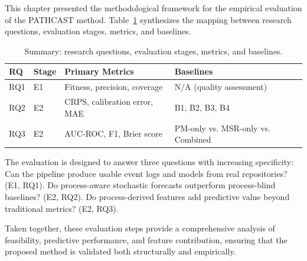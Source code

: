 This chapter presented the methodological framework for the empirical 
evaluation of the PATHCAST method. Table~\ref{tab:methodology-summary} 
synthesizes the mapping between research questions, evaluation stages, 
metrics, and baselines.

\begin{table}[htbp]
\centering
\caption{Summary: research questions, evaluation stages, metrics, and baselines.}
\label{tab:methodology-summary}
\small
\begin{tabular}{llll}
\toprule
\textbf{RQ} & \textbf{Stage} & \textbf{Primary Metrics} & \textbf{Baselines} \\
\midrule
RQ1 & E1 & 
    Fitness, precision, coverage & 
    N/A (quality assessment) \\
RQ2 & E2 & 
    CRPS, calibration error, MAE & 
    B1, B2, B3, B4 \\
RQ3 & E2 & 
    AUC-ROC, F1, Brier score & 
    PM-only vs. MSR-only vs. Combined \\
\bottomrule
\end{tabular}
\end{table}

The evaluation is designed to answer three questions with increasing 
specificity: Can the pipeline produce usable event logs and models from 
real repositories? (E1, RQ1). Do process-aware stochastic forecasts 
outperform process-blind baselines? (E2, RQ2). Do process-derived 
features add predictive value beyond traditional metrics? (E2, RQ3).

Taken together, these evaluation steps provide a comprehensive analysis of feasibility, predictive performance, and feature contribution, ensuring that the proposed method is validated both structurally and empirically.